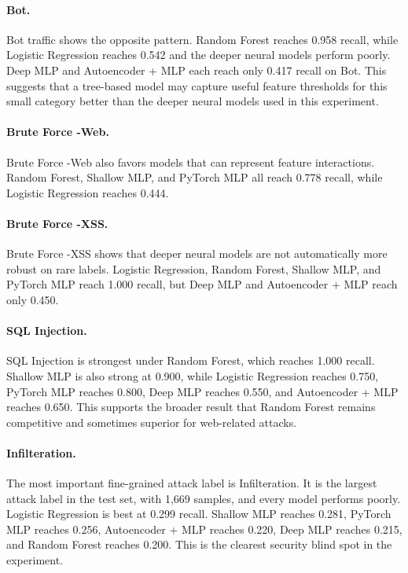 \documentclass[sigconf,nonacm]{acmart}
\begin{document}
\paragraph{Bot.}
Bot traffic shows the opposite pattern.
Random Forest reaches 0.958 recall, while Logistic Regression reaches 0.542 and the deeper neural models perform poorly.
Deep MLP and Autoencoder + MLP each reach only 0.417 recall on Bot.
This suggests that a tree-based model may capture useful feature thresholds for this small category better than the deeper neural models used in this experiment.

\paragraph{Brute Force -Web.}
Brute Force -Web also favors models that can represent feature interactions.
Random Forest, Shallow MLP, and PyTorch MLP all reach 0.778 recall, while Logistic Regression reaches 0.444.
\paragraph{Brute Force -XSS.}
Brute Force -XSS shows that deeper neural models are not automatically more robust on rare labels.
Logistic Regression, Random Forest, Shallow MLP, and PyTorch MLP reach 1.000 recall, but Deep MLP and Autoencoder + MLP reach only 0.450.

\paragraph{SQL Injection.}
SQL Injection is strongest under Random Forest, which reaches 1.000 recall.
Shallow MLP is also strong at 0.900, while Logistic Regression reaches 0.750, PyTorch MLP reaches 0.800, Deep MLP reaches 0.550, and Autoencoder + MLP reaches 0.650.
This supports the broader result that Random Forest remains competitive and sometimes superior for web-related attacks.

\paragraph{Infilteration.}
The most important fine-grained attack label is Infilteration.
It is the largest attack label in the test set, with 1,669 samples, and every model performs poorly.
Logistic Regression is best at 0.299 recall.
Shallow MLP reaches 0.281, PyTorch MLP reaches 0.256, Autoencoder + MLP reaches 0.220, Deep MLP reaches 0.215, and Random Forest reaches 0.200.
This is the clearest security blind spot in the experiment.
\end{document}
